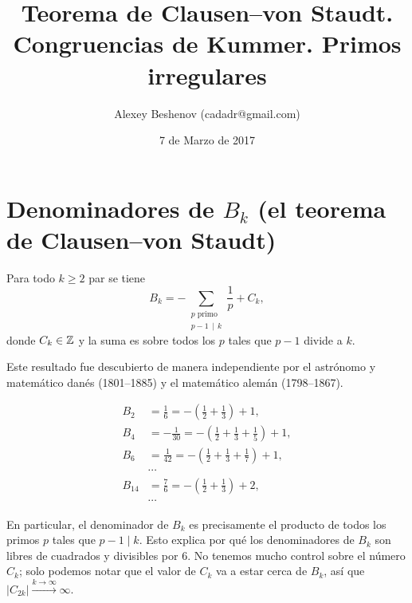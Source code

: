 \documentclass{article}
\author{Alexey Beshenov (cadadr@gmail.com)}
\title{Teorema de Clausen--von Staudt. Congruencias de Kummer. Primos irregulares}
\date{7 de Marzo de 2017}
\begin{document}
{\normalfont\sffamily\bfseries \maketitle}

\section*{Denominadores de $B_k$ (el teorema de Clausen--von Staudt)}

\begin{teorema*}
Para todo $k \ge 2$ par se tiene
$$B_k = -\sum_{\substack{p\text{ primo} \\ p-1 \, \mid \, k}} \frac{1}{p} + C_k,$$
donde $C_k \in \mathbb{Z}$ y la suma es sobre todos los $p$ tales que $p-1$ divide a $k$.
\end{teorema*}

Este resultado fue descubierto de manera independiente por el astrónomo y matemático danés  (1801--1885) y el matemático alemán  (1798--1867).

\begin{ejemplo*}
\begin{align*}
B_2 & = \frac{1}{6} = - \left(\frac{1}{2} + \frac{1}{3}\right) + 1,\\
B_4 & = -\frac{1}{30} = - \left(\frac{1}{2} + \frac{1}{3} + \frac{1}{5}\right) + 1,\\
B_6 & = \frac{1}{42} = - \left(\frac{1}{2} + \frac{1}{3} + \frac{1}{7}\right) + 1,\\
 & \cdots \\
B_{14} & = \frac{7}{6} = - \left(\frac{1}{2} + \frac{1}{3}\right) + 2,\\
 & \cdots
\end{align*}
\end{ejemplo*}

En particular, el denominador de $B_k$ es precisamente el producto de todos los primos $p$ tales que $p-1 \mid k$. Esto explica por qué los denominadores de $B_k$ son libres de cuadrados y divisibles por $6$. No tenemos mucho control sobre el número $C_k$; solo podemos notar que el valor de $C_k$ va a estar cerca de $B_k$, así que $|C_{2k}| \xrightarrow{k \to \infty} \infty$.
\end{document}
